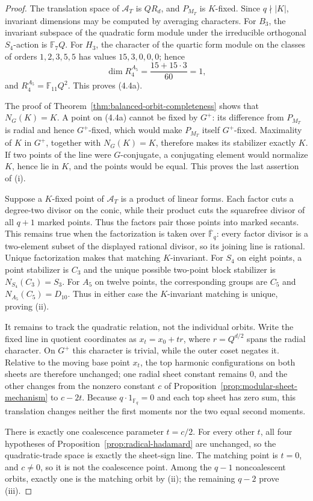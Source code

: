 \documentclass[11pt]{article}
\theoremstyle{definition}
\theoremstyle{remark}
\newcommand{\F}{\mathbb{F}}
\begin{document}
\begin{proof}
The translation space of \(\mathcal A_T\) is \(QR_d\), and \(P_{M_T}\)
is \(K\)-fixed.  Since \(q\nmid|K|\), invariant dimensions may be computed
by averaging characters.  For \(B_3\), the invariant subspace of the quadratic
form module under the irreducible orthogonal \(S_4\)-action is
\(\F_7Q\).  For \(H_3\), the character of the quartic form module on the
classes of orders \(1,2,3,5,5\) has values \(15,3,0,0,0\); hence
\[
 \dim R_4^{A_5}=\frac{15+15\cdot3}{60}=1,
\]
and \(R_4^{A_5}=\F_{11}Q^2\).  This proves (4.4a).

The proof of Theorem~\ref{thm:balanced-orbit-completeness} shows that
\(N_G(K)=K\).  A point on (4.4a) cannot be fixed by \(G^+\): its
difference from \(P_{M_T}\) is radial and hence \(G^+\)-fixed, which
would make \(P_{M_T}\) itself \(G^+\)-fixed.  Maximality of \(K\) in
\(G^+\), together with \(N_G(K)=K\), therefore makes its stabilizer
exactly \(K\).  If two points of the line were \(G\)-conjugate, a
conjugating element would normalize \(K\), hence lie in \(K\), and the
points would be equal.  This proves the last assertion of (i).

Suppose a \(K\)-fixed point of \(\mathcal A_T\) is a product of linear
forms.  Each factor cuts a degree-two divisor on the conic, while their
product cuts the squarefree divisor of all \(q+1\) marked points.  Thus
the factors pair those points into marked secants.  This remains true when
the factorization is taken over \(\overline{\F}_q\): every factor divisor is
a two-element subset of the displayed rational divisor, so its joining line
is rational.  Unique
factorization makes that matching \(K\)-invariant.  For \(S_4\) on eight
points, a point stabilizer is
\(C_3\) and the unique possible two-point block stabilizer is
\(N_{S_4}(C_3)=S_3\).  For \(A_5\) on twelve points, the corresponding
groups are \(C_5\) and \(N_{A_5}(C_5)=D_{10}\).  Thus in either case the
\(K\)-invariant matching is unique, proving (ii).

It remains to track the quadratic relation, not the individual orbits.
Write the fixed line in quotient coordinates as \(x_t=x_0+tr\), where
\(r=Q^{d/2}\) spans the radial character.  On \(G^+\) this character is
trivial, while the outer coset negates it.  Relative to the moving base
point \(x_t\), the top harmonic configurations on both sheets are
therefore unchanged; one radial sheet constant remains \(0\), and the
other changes from the nonzero constant \(c\) of
Proposition~\ref{prop:modular-sheet-mechanism} to \(c-2t\).
Because \(q\cdot1_{\F_q}=0\) and each top sheet has zero sum, this
translation changes neither the first moments nor the two equal second
moments.

There is exactly one coalescence parameter \(t=c/2\).  For every other
\(t\), all four hypotheses of
Proposition~\ref{prop:radical-hadamard} are unchanged, so the
quadratic-trade space is exactly the sheet-sign line.  The matching
point is \(t=0\), and \(c\ne0\), so it is not the coalescence point.
Among the \(q-1\) noncoalescent orbits, exactly one is the matching
orbit by (ii); the remaining \(q-2\) prove (iii).
\end{proof}
\end{document}
